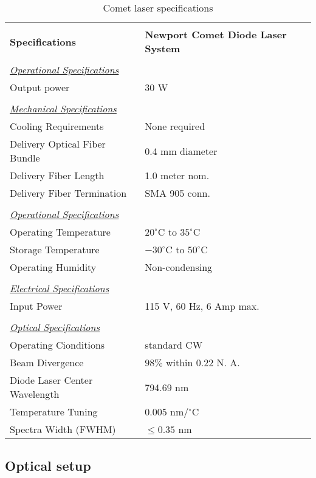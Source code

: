 {\begin{table}
\begin{center}
\begin{tabular}{|l|l|}
\hline
& \\
{\bf Specifications}&{\bf Newport Comet Diode Laser System} \\
\hline
& \\
\underline {\it Operational Specifications}& \\
Output power			& 30 W \\
& \\
\underline {\it Mechanical Specifications}& \\
Cooling Requirements 		& None required \\
Delivery Optical Fiber Bundle   & 0.4 mm diameter \\
Delivery Fiber Length		& 1.0 meter nom.\\
Delivery Fiber Termination	& SMA 905 conn. \\
& \\
\underline {\it Operational Specifications}& \\
Operating Temperature   & $20^\circ$C to $35^\circ$C \\
Storage Temperature     & $-30^\circ$C to $50^\circ$C \\
Operating Humidity        & Non-condensing  \\
& \\
\underline {\it Electrical Specifications}& \\
Input Power	                & 115 V, 60 Hz, 6 Amp max. \\
& \\
\underline {\it Optical Specifications}& \\
Operating Cionditions 		& standard CW \\
Beam Divergence        & $98\%$ within 0.22 N. A. \\
Diode Laser Center Wavelength   & 794.69 nm \\
Temperature Tuning	& 0.005 nm/$^\circ$C \\
Spectra Width (FWHM)       & $\le 0.35$ nm \\
\hline
\end{tabular}
\label{tab:Comet}
\caption{Comet laser specifications}
\end{center}
\end{table}

\subsection{Optical setup}

}
